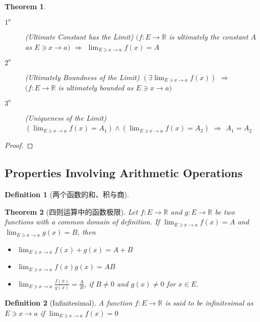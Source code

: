 \documentclass[onecolumn]{ctexart}
\newtheorem{definition}{Definition}
\newtheorem{theorem}{Theorem}
\begin{document}
\begin{theorem}
  \begin{description}
    \item[$1^o$] (Ultimate Constant has the Limit) $(f:E \to \mathbb{R}$ is ultimately the constant $A$ as $E 
    \owns x \to a)$ $\Rightarrow$ $\lim_{E \owns x \to a} f(x) = A$
    \item[$2^o$] (Ultimately Boundness of the Limit) $(\exists \lim_{E \owns x \to a} f(x))$ $\Rightarrow$ $(f: E \to \mathbb{R}$ is ultimately bounded as $E \owns x \to a)$
    \item[$3^o$] (Uniqueness of the Limit) $(\lim_{E \owns x \to a} f(x) = A_1) \wedge (\lim_{E \owns x \to a} f(x) = A_2)$ $\Rightarrow$ $A_1 = A_2$
  \end{description}
\end{theorem}
\begin{proof}
  
\end{proof}

\subsection{Properties Involving Arithmetic Operations}

\begin{definition}[两个函数的和、积与商]
  
\end{definition}

\begin{theorem}[四则运算中的函数极限]
  Let $f:E \to \mathbb{R}$ and $g:E \to \mathbb{R}$ be two functions with a 
  common domain of definition. If $\lim_{E \owns x \to a} f(x) = A$ and 
  $\lim_{E \owns x \to a} g(x) = B$, then
  \begin{itemize}
    \item $\lim_{E \owns x \to a} f(x) + g(x) = A + B$
    \item $\lim_{E \owns x \to a} f(x) g(x) = AB$
    \item $\lim_{E \owns x \to a} \frac{f(x)}{g(x)} = \frac{A}{B}$, if 
    $B \neq 0$ and $g(x) \neq 0$ for $x \in E$.
  \end{itemize}
\end{theorem}

\begin{definition}[Infinitesimal]
  A function $f: E \to \mathbb{R}$ is said to be infinitesimal as $E \owns x \to 
  a$ if $\lim_{E \owns x \to a} f(x) = 0$
\end{definition}
\end{document}
